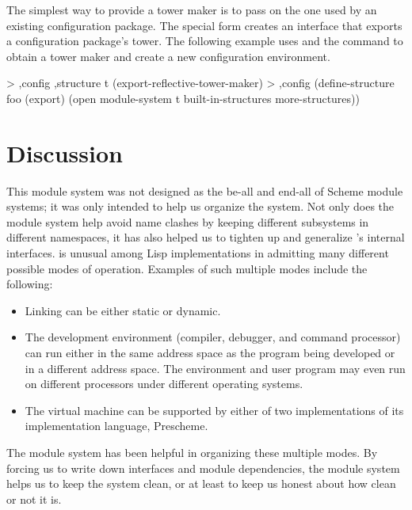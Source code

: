 The simplest way to provide a tower maker is to pass on the one used by
 an existing configuration package.
The special form  creates an interface
 that exports a configuration package's tower.
The following example uses  and
 the  command to obtain a tower maker and create a new
 configuration environment.

\begin{example}
> ,config ,structure t (export-reflective-tower-maker)
> ,config (define-structure foo (export)
            (open module-system
                  t
                  built-in-structures
                  more-structures))
\end{example}


\section{Discussion}

This module system was not designed as the be-all and end-all of
Scheme module systems; it was only intended to help us
organize the \hack{} system.  Not only does the module system
help avoid name clashes by keeping different subsystems in different
namespaces, it has also helped us to tighten up and generalize
\hack{}'s internal interfaces.  \hack{} is unusual among Lisp
implementations in admitting many different possible modes of
operation.  Examples of such multiple modes include the following:
\begin{itemize}
    \item Linking can be either static or dynamic.

    \item The development environment (compiler, debugger, and command
    processor) can run either in the same address space as the program
    being developed or in a different address space.  The environment and
    user program may even run on different processors under different
    operating systems\cite{Rees-Donald:Program}.

    \item The virtual machine can be supported by either
    of two implementations of its implementation language, Prescheme.
\end{itemize}
The module system has been helpful in organizing these multiple modes.
By forcing us to write down interfaces and module dependencies, the
module system helps us to keep the system clean, or at least to keep
us honest about how clean or not it is.

